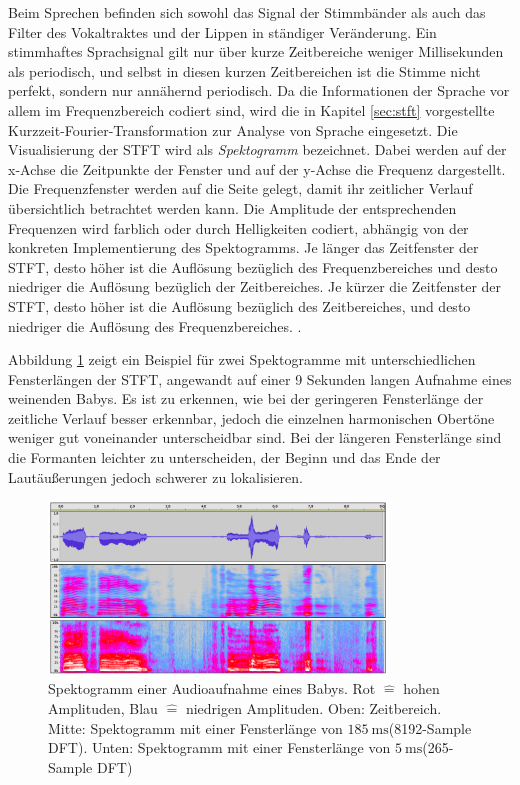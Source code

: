 Beim Sprechen befinden sich sowohl das Signal der Stimmbänder als auch das Filter des Vokaltraktes und der Lippen in ständiger Veränderung. Ein stimmhaftes Sprachsignal gilt nur über kurze Zeitbereiche weniger Millisekunden als periodisch, und selbst in diesen kurzen Zeitbereichen ist die Stimme nicht perfekt, sondern nur annähernd periodisch. Da die Informationen der Sprache vor allem im Frequenzbereich codiert sind, wird die in Kapitel \ref{sec:stft} vorgestellte Kurzzeit-Fourier-Transformation zur Analyse von Sprache eingesetzt. Die Visualisierung der STFT wird als \emph{Spektogramm} bezeichnet. Dabei werden auf der x-Achse die Zeitpunkte der Fenster und auf der y-Achse die Frequenz dargestellt. Die Frequenzfenster werden \glqq auf die Seite gelegt\grqq{}, damit ihr zeitlicher Verlauf übersichtlich betrachtet werden kann. Die Amplitude der entsprechenden Frequenzen wird farblich oder durch Helligkeiten codiert, abhängig von der konkreten Implementierung des Spektogramms. Je länger das Zeitfenster der STFT, desto höher ist die Auflösung bezüglich des Frequenzbereiches und desto niedriger die Auflösung bezüglich der Zeitbereiches. Je kürzer die Zeitfenster der STFT, desto höher ist die Auflösung bezüglich des Zeitbereiches, und desto niedriger die Auflösung des Frequenzbereiches.\cite[S. 45 - 50]{sprachverarbeitung} \cite[Acoustic Representations of Speech]{speechAcoustics}. 

Abbildung \ref{img:spectoExample} zeigt ein Beispiel für zwei Spektogramme mit unterschiedlichen Fensterlängen der STFT, angewandt auf einer 9 Sekunden langen Aufnahme eines weinenden Babys. Es ist zu erkennen, wie bei der geringeren Fensterlänge der zeitliche Verlauf besser erkennbar, jedoch die einzelnen harmonischen Obertöne weniger gut voneinander unterscheidbar sind. Bei der längeren Fensterlänge sind die Formanten leichter zu unterscheiden, der Beginn und das Ende der Lautäußerungen jedoch schwerer zu lokalisieren.

\begin{figure}[H]
	\centering
	\includegraphics[width=0.8\textwidth]{bilder/spectogram03.png}
	\caption{Spektogramm einer Audioaufnahme eines Babys. Rot $\hat{=}$ hohen Amplituden, Blau $\hat{=}$ niedrigen Amplituden. Oben: Zeitbereich. Mitte: Spektogramm mit einer Fensterlänge von $\SI{185}{\milli\second}$(8192-Sample DFT). Unten: Spektogramm mit einer Fensterlänge von $\SI{5}{\milli\second}$(265-Sample DFT)}
	\label{img:spectoExample}
\end{figure}	

